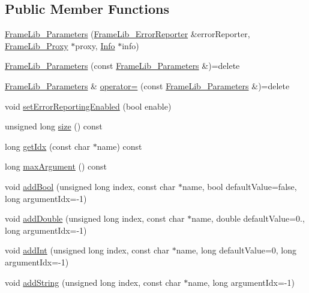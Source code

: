 \subsection*{Public Member Functions}
\begin{DoxyCompactItemize}
\item 
\hyperlink{class_frame_lib___parameters_a4adc6d011e6a9842dc11025789dcda27}{Frame\+Lib\+\_\+\+Parameters} (\hyperlink{class_frame_lib___error_reporter}{Frame\+Lib\+\_\+\+Error\+Reporter} \&error\+Reporter, \hyperlink{struct_frame_lib___proxy}{Frame\+Lib\+\_\+\+Proxy} $\ast$proxy, \hyperlink{class_frame_lib___parameters_1_1_info}{Info} $\ast$info)
\item 
\hyperlink{class_frame_lib___parameters_a45a182e2dc59c805b148f36571fe93a6}{Frame\+Lib\+\_\+\+Parameters} (const \hyperlink{class_frame_lib___parameters}{Frame\+Lib\+\_\+\+Parameters} \&)=delete
\item 
\hyperlink{class_frame_lib___parameters}{Frame\+Lib\+\_\+\+Parameters} \& \hyperlink{class_frame_lib___parameters_ad9a863e077776c631cf7e9923ace933d}{operator=} (const \hyperlink{class_frame_lib___parameters}{Frame\+Lib\+\_\+\+Parameters} \&)=delete
\item 
void \hyperlink{class_frame_lib___parameters_a483bca3b2937ffd979af819ef3e32b3e}{set\+Error\+Reporting\+Enabled} (bool enable)
\item 
unsigned long \hyperlink{class_frame_lib___parameters_a391d0cb37c904981f7ad52bc0ba1b111}{size} () const
\item 
long \hyperlink{class_frame_lib___parameters_a6188f2b27de6850129ea084c99aa4669}{get\+Idx} (const char $\ast$name) const
\item 
long \hyperlink{class_frame_lib___parameters_a79b95cc8a0494356b12fa2ac51ece583}{max\+Argument} () const
\item 
void \hyperlink{class_frame_lib___parameters_ad975cc435f4fa2006e1a722dad784d9a}{add\+Bool} (unsigned long index, const char $\ast$name, bool default\+Value=false, long argument\+Idx=-\/1)
\item 
void \hyperlink{class_frame_lib___parameters_ab05bf4cd30eecd26bba972efd171798c}{add\+Double} (unsigned long index, const char $\ast$name, double default\+Value=0., long argument\+Idx=-\/1)
\item 
void \hyperlink{class_frame_lib___parameters_a9cb86d9fa829686a58e7776dcc45b60a}{add\+Int} (unsigned long index, const char $\ast$name, long default\+Value=0, long argument\+Idx=-\/1)
\item 
void \hyperlink{class_frame_lib___parameters_a54881a00c48e949914b130383c110a0a}{add\+String} (unsigned long index, const char $\ast$name, long argument\+Idx=-\/1)

\end{DoxyCompactItemize}
